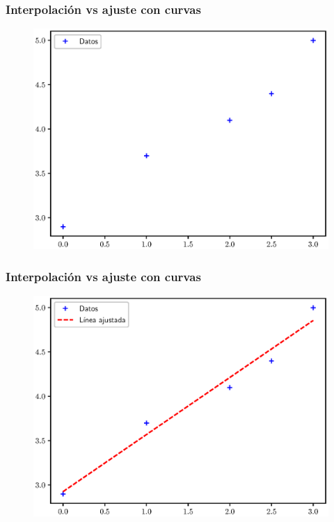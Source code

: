 \documentclass[12pt]{beamer}
\begin{document}
\begin{frame}[fragile]
\frametitle{Interpolación vs ajuste con curvas}
\begin{figure}
    \centering
    \includegraphics[scale=0.55]{Imagenes/Intro_Interpolacion_001.eps}
\end{figure}
\end{frame}
\begin{frame}[fragile]
\frametitle{Interpolación vs ajuste con curvas}
\begin{figure}
    \centering
    \includegraphics[scale=0.55]{Imagenes/Intro_Interpolacion_002.eps}
\end{figure}
\end{frame}
\end{document}

